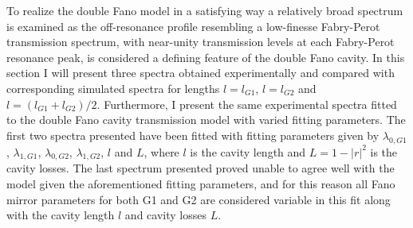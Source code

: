 To realize the double Fano model in a satisfying way a relatively broad spectrum is examined as the off-resonance profile resembling a low-finesse Fabry-Perot transmission spectrum, with near-unity transmission levels at each Fabry-Perot resonance peak, is considered a defining feature of the double Fano cavity. In this section I will present three spectra obtained experimentally and compared with corresponding simulated spectra for lengths $l=l_{G1}$, $l=l_{G2}$ and $l=(l_{G1} + l_{G2})/2$. Furthermore, I present the same experimental spectra fitted to the double Fano cavity transmission model with varied fitting parameters. The first two spectra presented have been fitted with fitting parameters given by $\lambda_{0,G1}$, $\lambda_{1,G1}$, $\lambda_{0,G2}$, $\lambda_{1,G2}$, $l$ and $L$, where $l$ is the cavity length and $L = 1-|r|^2$ is the cavity losses. The last spectrum presented proved unable to agree well with the model given the aforementioned fitting parameters, and for this reason all Fano mirror parameters for both G1 and G2 are considered variable in this fit along with the cavity length $l$ and cavity losses $L$.

